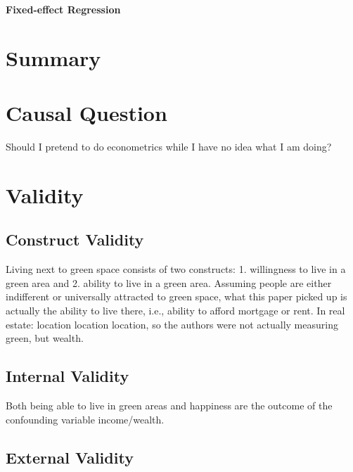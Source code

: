 \begin{center}
    \textbf{Fixed-effect Regression}
\end{center}

\begin{hangparas}{0.5in}{1}
\end{hangparas}

\section{Summary}

\textcite{white:2013}

\section{Causal Question}

Should I pretend to do econometrics while I have no idea what I am doing?

\section{Validity}

\subsection{Construct Validity}

Living next to green space consists of two constructs: 1. willingness to live in a green area and 2. ability to live in a green area. Assuming people are either indifferent or universally attracted to green space, what this paper picked up is actually the ability to live there, i.e., ability to afford mortgage or rent. In real estate: location location location, so the authors were not actually measuring green, but wealth.

\subsection{Internal Validity}

Both being able to live in green areas and happiness are the outcome of the confounding variable income/wealth.

\subsection{External Validity}

